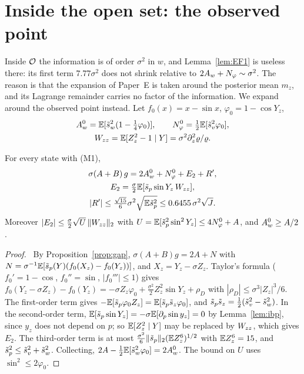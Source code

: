 \section{Inside the open set: the observed point}
\label{sec:inside}

Inside $\mathcal O$ the information is of order $\sigma^2$ in $w$, and Lemma~\ref{lem:EF1} is useless there: its first term $7.77\sigma^2$ does not shrink relative to $2A_w+N_\varphi\sim\sigma^2$.
The reason is that the expansion of Paper~E is taken around the posterior mean $m_z$, and its Lagrange remainder carries no factor of the information.
We expand around the observed point instead.
Let $f_0(x)=x-\sin x$, $\varphi_0=1-\cos Y_z$,
\begin{equation}
\begin{gathered}
A_w^0=\mathbb{E}[\tilde s_w^2(1-\tfrac14\varphi_0)],\qquad N_\varphi^0=\tfrac12\mathbb{E}[\tilde s_v^2\varphi_0],\\ W_{zz}=\mathbb{E}[Z_z^2-1\mid Y]=\sigma^2\partial_z^2\varrho/\varrho .
\end{gathered}
\end{equation}

\begin{lemma}\label{lem:EGD}
For every state with \textup{(M1)},
\[
\begin{gathered}
\sigma(A+B)\,g=2A_w^0+N_\varphi^0+E_2+R',\\ E_2=\tfrac\sigma2\mathbb{E}[\tilde s_p\sin Y_z\,W_{zz}],\\ |R'|\le\tfrac{\sqrt{15}}6\sigma^2\sqrt{\mathbb{E}\tilde s_p^2}\le0.6455\,\sigma^2\sqrt{J} .
\end{gathered}
\]
Moreover $|E_2|\le\frac\sigma2\sqrt U\,\|W_{zz}\|_2$ with $U=\mathbb{E}[\tilde s_p^2\sin^2Y_z]\le4N_\varphi^0+A$, and $A_w^0\ge A/2$.
\end{lemma}
\begin{proof}\proofst\
By Proposition~\ref{prop:gap}, $\sigma(A+B)g=2A+N$ with $N=\sigma^{-1}\mathbb{E}[\tilde s_p(Y)(f_0(X_z)-f_0(Y_z))]$, and $X_z=Y_z-\sigma Z_z$.
Taylor's formula ($f_0'=1-\cos$, $f_0''=\sin$, $|f_0'''|\le1$) gives $f_0(Y_z-\sigma Z_z)-f_0(Y_z)=-\sigma Z_z\varphi_0+\frac{\sigma^2}2Z_z^2\sin Y_z+\rho_D$ with $|\rho_D|\le\sigma^3|Z_z|^3/6$.
The first-order term gives $-\mathbb{E}[\tilde s_p\varphi_0Z_z]=\mathbb{E}[\tilde s_p\tilde s_z\varphi_0]$, and $\tilde s_p\tilde s_z=\frac12(\tilde s_v^2-\tilde s_w^2)$.
In the second-order term, $\mathbb{E}[\tilde s_p\sin Y_z]=-\sigma\mathbb{E}[\partial_p\sin y_z]=0$ by Lemma~\ref{lem:ibp}, since $y_z$ does not depend on $p$; so $\mathbb{E}[Z_z^2\mid Y]$ may be replaced by $W_{zz}$, which gives $E_2$.
The third-order term is at most $\frac{\sigma^2}6\|\tilde s_p\|_2(\mathbb{E} Z_z^6)^{1/2}$ with $\mathbb{E} Z_z^6=15$, and $\tilde s_p^2\le\tilde s_v^2+\tilde s_w^2$.
Collecting, $2A-\frac12\mathbb{E}[\tilde s_w^2\varphi_0]=2A_w^0$. The bound on $U$ uses $\sin^2\le2\varphi_0$.
\end{proof}

